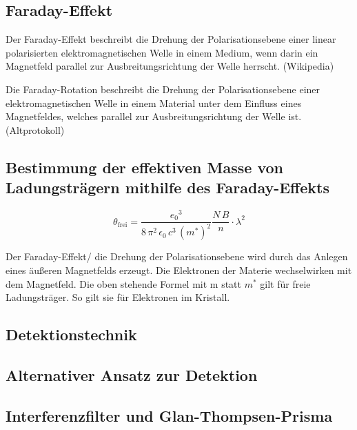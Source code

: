 \subsection{Faraday-Effekt}
Der Faraday-Effekt beschreibt die Drehung der Polarisationsebene einer linear polarisierten elektromagnetischen Welle in einem Medium, wenn darin ein Magnetfeld parallel zur Ausbreitungsrichtung der Welle herrscht. (Wikipedia)

Die Faraday-Rotation beschreibt die Drehung der Polarisationsebene einer elektromagnetischen Welle in einem Material unter dem Einfluss eines Magnetfeldes, welches parallel zur Ausbreitungsrichtung der Welle ist. (Altprotokoll)



\subsection{Bestimmung der effektiven Masse von Ladungsträgern mithilfe des Faraday-Effekts}
\begin{equation}
    \theta_\text{frei} = \frac{{e_0}^3}{8 \, \pi^2 \, \epsilon_0 \, c^3 \, (m^*)^2} \frac{N \, B}{n} \cdot \lambda^2
    \label{eq:theta}
\end{equation}

Der Faraday-Effekt/ die Drehung der Polarisationsebene wird durch das Anlegen eines äußeren Magnetfelds erzeugt. Die Elektronen der Materie wechselwirken mit dem Magnetfeld.
Die oben stehende Formel mit m statt $m^*$ gilt für freie Ladungsträger. So gilt sie für Elektronen im Kristall.


\subsection{Detektionstechnik}

\subsection{Alternativer Ansatz zur Detektion}

\subsection{Interferenzfilter und Glan-Thompsen-Prisma}